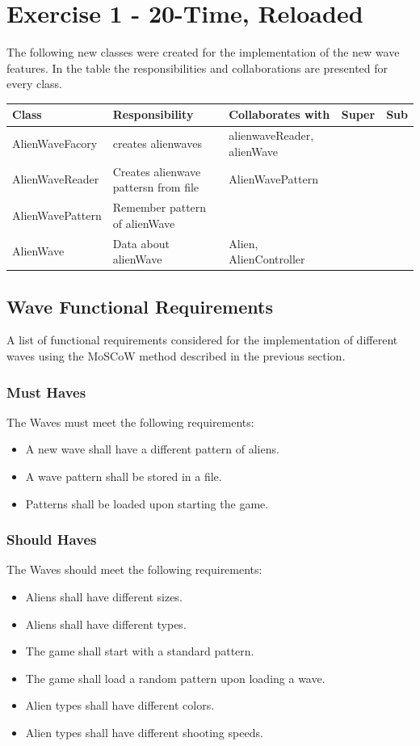 \documentclass[10pt]{article}
\begin{document}
\section{Exercise 1 - 20-Time, Reloaded }
The following new classes were created for the implementation of the new wave features.
In the table the responsibilities and collaborations are presented for every class.
\begin{center}
    \begin{tabular}{ | p{3cm} | p{4cm} | p{3cm} | p{2cm} | p{3cm} |}
  \hline
    Class & Responsibility & Collaborates with & Super & Sub \\ \hline
   AlienWaveFacory & creates alienwaves & alienwaveReader, alienWave &  & \\ \hline
   AlienWaveReader & Creates alienwave pattersn from file & AlienWavePattern &  & \\ \hline
   AlienWavePattern & Remember pattern of alienWave &  &  &  \\ \hline
   AlienWave &  Data about alienWave & Alien, AlienController  &  & \\ \hline

    \end{tabular}
\end{center}

\subsection{Wave Functional Requirements}

A list of functional requirements considered for the implementation of different waves using the MoSCoW method described in the previous section.

\subsubsection{Must Haves}
The Waves must meet the following requirements:
\begin{itemize}
	\item A new wave shall have a different pattern of aliens.
	\item A wave pattern shall be stored in a file.
	\item Patterns shall be loaded upon starting the game.
\end{itemize}

\subsubsection{Should Haves}
The Waves should meet the following requirements:
\begin{itemize}
	\item Aliens shall have different sizes.
	\item Aliens shall have different types.
	\item The game shall start with a standard pattern. 
	\item The game shall load a random pattern upon loading a wave.
	\item Alien types shall have different colors.
	\item Alien types shall have different shooting speeds.
\end{itemize}
\end{document}
